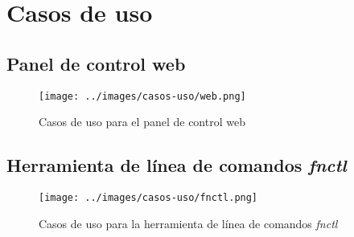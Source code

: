 \section{Casos de uso}

\subsection{Panel de control web}

\begin{figure}[H]
    \centering
    \texttt{[image: ../images/casos-uso/web.png]}
    \caption{Casos de uso para el panel de control web}
    \label{fig:cu-web}
\end{figure}

\subsection{Herramienta de línea de comandos \emph{fnctl}}

\begin{figure}[H]
    \centering
    \texttt{[image: ../images/casos-uso/fnctl.png]}
    \caption{Casos de uso para la herramienta de línea de comandos \emph{fnctl}}
    \label{fig:cu-fnctl}
\end{figure}